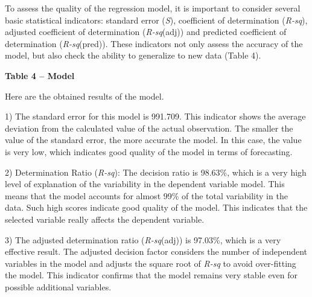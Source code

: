 To assess the quality of the regression model, it is important to
consider several basic statistical indicators: standard error
(\emph{S}), coefficient of determination (\emph{R-sq}), adjusted
coefficient of determination (\emph{R-sq}(adj)) and predicted
coefficient of determination (\emph{R-sq}(pred)). These indicators not
only assess the accuracy of the model, but also check the ability to
generalize to new data (Table 4).

{\bfseries Table 4 -- Model}


Here are the obtained results of the model.

1) The standard error for this model is 991.709. This indicator shows
the average deviation from the calculated value of the actual
observation. The smaller the value of the standard error, the more
accurate the model. In this case, the value is very low, which indicates
good quality of the model in terms of forecasting.

2) Determination Ratio (\emph{R-sq}): The decision ratio is 98.63\%,
which is a very high level of explanation of the variability in the
dependent variable model. This means that the model accounts for almost
99\% of the total variability in the data. Such high scores indicate
good quality of the model. This indicates that the selected variable
really affects the dependent variable.

3) The adjusted determination ratio (\emph{R-sq}(adj)) is 97.03\%, which
is a very effective result. The adjusted decision factor considers the
number of independent variables in the model and adjusts the square root
of \emph{R-sq} to avoid over-fitting the model. This indicator confirms
that the model remains very stable even for possible additional
variables.

